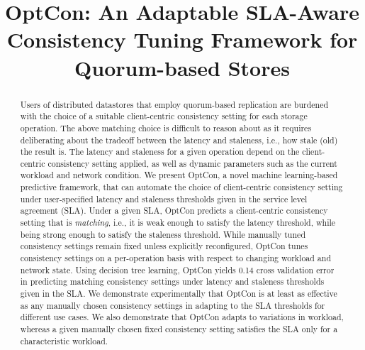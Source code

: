 \documentclass[conference]{IEEEtran}
\begin{document}
\title{OptCon: An Adaptable SLA-Aware Consistency Tuning Framework for Quorum-based Stores}

\author{
}










\maketitle
\thispagestyle{plain}
\pagestyle{plain}

\begin{abstract}
Users of distributed datastores that employ quorum-based replication are burdened with the choice of a suitable client-centric consistency setting for each storage operation. The above matching choice is difficult to reason about as it requires deliberating about the tradeoff between the latency and staleness, i.e., how stale (old) the result is. The latency and staleness for a given operation depend on the client-centric consistency setting applied, as well as dynamic parameters such as the current workload and network condition.  We present OptCon, a novel machine learning-based predictive framework, that can automate the choice of client-centric consistency setting under user-specified latency and staleness thresholds given in the service level agreement (SLA). Under a given SLA, OptCon predicts a client-centric consistency setting that is \emph{matching}, i.e., it is weak enough to satisfy the latency threshold, while being strong enough to satisfy the staleness threshold. While manually tuned consistency settings remain fixed unless explicitly reconfigured, OptCon tunes consistency settings on a per-operation basis with respect to changing workload and network state.
Using decision tree learning, OptCon yields 0.14 cross validation error
in predicting matching consistency settings under latency and staleness thresholds given in the SLA.
  We demonstrate experimentally that OptCon is at least as effective as any  manually chosen
  consistency settings in adapting to the SLA thresholds for different use cases.
  We also demonstrate that OptCon adapts to variations in workload, whereas a given manually chosen fixed
  consistency setting satisfies the SLA only for a characteristic workload. \end{abstract}
\end{document}
